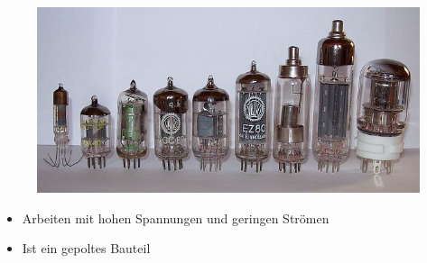 \begin{frame}
  \begin{center}
    \begin{figure}
      \includegraphics[width=\textwidth,height=.5\textheight,keepaspectratio]{a06/Roehren.jpg}
    \end{figure}
  \end{center}
  \begin{itemize}
    \item Arbeiten mit hohen Spannungen und geringen Strömen
    \item Ist ein gepoltes Bauteil
  \end{itemize}
\end{frame}

